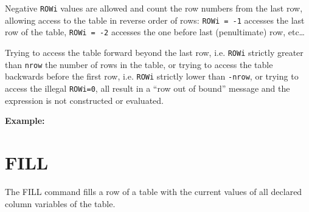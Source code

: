 

Negative \texttt{ROWi} values are allowed and count the row numbers from
the last row, allowing access to the table in reverse order of rows:
\texttt{ROWi~=~-1} accesses the last row of the table,
\texttt{ROWi~=~-2} accesses the one before last (penultimate) row,
etc\ldots  

Trying to access the table forward beyond the last row, i.e. \texttt{ROWi}
strictly greater than {\tt nrow} the number of rows in the table, or
trying to access the table backwards before the first row, i.e. \texttt{ROWi}
strictly lower than {\tt -nrow}, or trying to access the illegal
\texttt{ROWi=0}, all result in a ``row out of bound'' message and the
expression is not constructed or evaluated. 


{\bf Example:}

\section{FILL} 
\label{sec:fill}
The FILL command fills a row of a table with the current values of all
declared column variables of the table.

